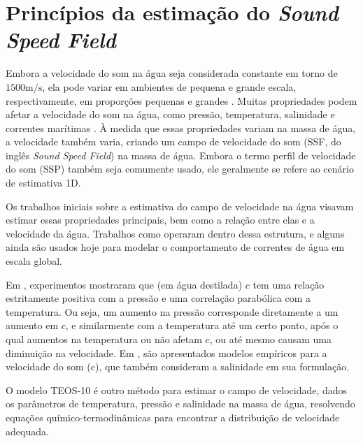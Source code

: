 \section{Princípios da estimação do \textit{Sound Speed Field}}

Embora a velocidade do som na água seja considerada constante em torno de $1500 \si{\meter}/\si{\second}$, ela pode variar em ambientes de pequena e grande escala, respectivamente, em proporções pequenas e grandes \cite{kieffer_sound_1977,trusler_determination_2017,li_sound_2015,pinson_sound_2010}. Muitas propriedades podem afetar a velocidade do som na água, como pressão, temperatura, salinidade e correntes marítimas \cite{wilson_speed_1959,medwin_fundamentals_1999,mcdougall_getting_2011,delgrosso_new_1974}. À medida que essas propriedades variam na massa de água, a velocidade também varia, criando um campo de velocidade do som (SSF, do inglês \textit{Sound Speed Field}) na massa de água. Embora o termo perfil de velocidade do som (SSP) \cite{li_acoustic_2019,li_sound_2015,pinson_sound_2010} também seja comumente usado, ele geralmente se refere ao cenário de estimativa 1D.

Os trabalhos iniciais sobre a estimativa do campo de velocidade na água visavam estimar essas propriedades principais, bem como a relação entre elas e a velocidade da água. Trabalhos como \cite{wilson_speed_1959,medwin_fundamentals_1999,mcdougall_getting_2011,delgrosso_new_1974,chen_speed_1977,wong_speed_1995,roquet_accurate_2015} operaram dentro dessa estrutura, e alguns ainda são usados hoje para modelar o comportamento de correntes de água em escala global.

Em \cite{wilson_speed_1959}, experimentos mostraram que (em água destilada) $c$ tem uma relação estritamente positiva com a pressão e uma correlação parabólica com a temperatura. Ou seja, um aumento na pressão corresponde diretamente a um aumento em $c$, e similarmente com a temperatura até um certo ponto, após o qual aumentos na temperatura ou não afetam $c$, ou até mesmo causam uma diminuição na velocidade. Em \cite{medwin_fundamentals_1999}, são apresentados modelos empíricos para a velocidade do som (c), que também consideram a salinidade em sua formulação.

O modelo TEOS-10 \cite{mcdougall_getting_2011} é outro método para estimar o campo de velocidade, dados os parâmetros de temperatura, pressão e salinidade na massa de água, resolvendo equações químico-termodinâmicas para encontrar a distribuição de velocidade adequada.

